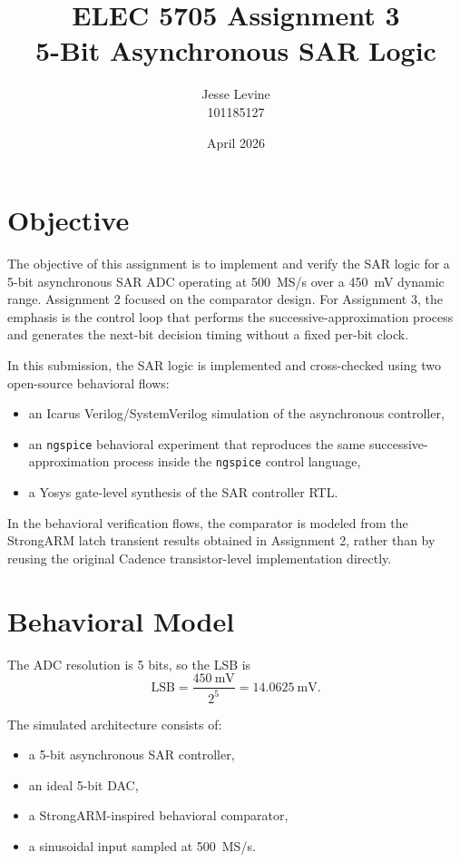 \documentclass[11pt]{article}
\title{ELEC 5705 Assignment 3\\5-Bit Asynchronous SAR Logic}
\author{Jesse Levine \\ 101185127}
\date{April 2026}
\begin{document}
\maketitle

\section{Objective}
The objective of this assignment is to implement and verify the SAR logic for a 5-bit asynchronous SAR ADC operating at \SI{500}{MS/s} over a \SI{450}{mV} dynamic range. Assignment 2 focused on the comparator design. For Assignment 3, the emphasis is the control loop that performs the successive-approximation process and generates the next-bit decision timing without a fixed per-bit clock.

In this submission, the SAR logic is implemented and cross-checked using two open-source behavioral flows:
\begin{itemize}
    \item an Icarus Verilog/SystemVerilog simulation of the asynchronous controller,
    \item an \texttt{ngspice} behavioral experiment that reproduces the same successive-approximation process inside the \texttt{ngspice} control language,
    \item a Yosys gate-level synthesis of the SAR controller RTL.
\end{itemize}
In the behavioral verification flows, the comparator is modeled from the StrongARM latch transient results obtained in Assignment 2, rather than by reusing the original Cadence transistor-level implementation directly.

\section{Behavioral Model}
The ADC resolution is 5 bits, so the LSB is
\begin{equation}
\mathrm{LSB} = \frac{450\ \mathrm{mV}}{2^5} = 14.0625\ \mathrm{mV}.
\end{equation}

The simulated architecture consists of:
\begin{itemize}
    \item a 5-bit asynchronous SAR controller,
    \item an ideal 5-bit DAC,
    \item a StrongARM-inspired behavioral comparator,
    \item a sinusoidal input sampled at \SI{500}{MS/s}.
\end{itemize}
\end{document}
